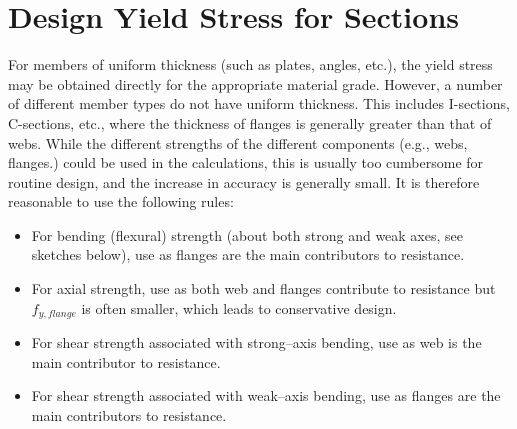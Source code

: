 \section{Design Yield Stress for Sections}\label{sec:ys}
For members of uniform thickness (such as plates, angles, etc.), the yield stress may be obtained directly for the appropriate material grade. However, a number of different member types do not have uniform thickness. This includes I-sections, C-sections, etc., where the thickness of flanges is generally greater than that of webs. While the different strengths of the different components (e.g., webs, flanges.) could be used in the calculations, this is usually too cumbersome for routine design, and the increase in accuracy is generally small. It is therefore reasonable to use the following rules:
\begin{itemize}
\item For bending (flexural) strength (about both strong and weak axes, see sketches below), use  as flanges are the main contributors to resistance.
\begin{figure}[H]
\centering

\end{figure}
\item For axial strength, use  as both web and flanges contribute to resistance but $f_{y,flange}$ is often smaller, which leads to conservative design.
\begin{figure}[H]
\centering

\end{figure}
\item For shear strength associated with strong--axis bending, use  as web is the main contributor to resistance.
\begin{figure}[H]
\centering

\end{figure}
\item For shear strength associated with weak--axis bending, use  as flanges are the main contributors to resistance.
\begin{figure}[H]
\centering

\end{figure}
\end{itemize}
